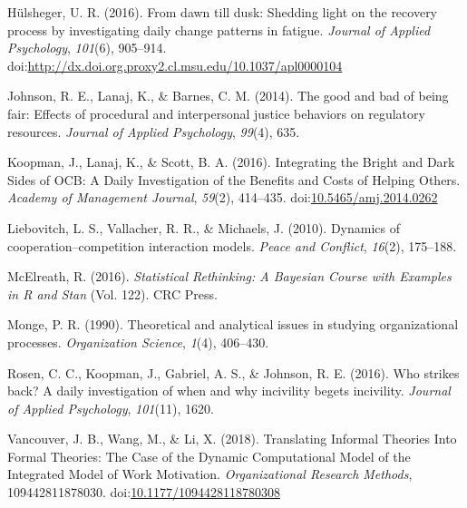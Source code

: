 \documentclass[english,,man]{apa6}
\theoremstyle{definition}
\theoremstyle{definition}
\theoremstyle{definition}
\theoremstyle{remark}
\begin{document}
\leavevmode\hypertarget{ref-hulsheger_dawn_2016}{}%
Hülsheger, U. R. (2016). From dawn till dusk: Shedding light on the
recovery process by investigating daily change patterns in fatigue.
\emph{Journal of Applied Psychology}, \emph{101}(6), 905--914.
doi:\href{https://doi.org/http://dx.doi.org.proxy2.cl.msu.edu/10.1037/apl0000104}{http://dx.doi.org.proxy2.cl.msu.edu/10.1037/apl0000104}

\leavevmode\hypertarget{ref-johnson_good_2014}{}%
Johnson, R. E., Lanaj, K., \& Barnes, C. M. (2014). The good and bad of
being fair: Effects of procedural and interpersonal justice behaviors on
regulatory resources. \emph{Journal of Applied Psychology},
\emph{99}(4), 635.

\leavevmode\hypertarget{ref-koopman_integrating_2016}{}%
Koopman, J., Lanaj, K., \& Scott, B. A. (2016). Integrating the Bright
and Dark Sides of OCB: A Daily Investigation of the Benefits and Costs
of Helping Others. \emph{Academy of Management Journal}, \emph{59}(2),
414--435.
doi:\href{https://doi.org/10.5465/amj.2014.0262}{10.5465/amj.2014.0262}

\leavevmode\hypertarget{ref-liebovitch2010dynamics}{}%
Liebovitch, L. S., Vallacher, R. R., \& Michaels, J. (2010). Dynamics of
cooperation--competition interaction models. \emph{Peace and Conflict},
\emph{16}(2), 175--188.

\leavevmode\hypertarget{ref-mcelreath_statistical_2016}{}%
McElreath, R. (2016). \emph{Statistical Rethinking: A Bayesian Course
with Examples in R and Stan} (Vol. 122). CRC Press.

\leavevmode\hypertarget{ref-monge_theoretical_1990}{}%
Monge, P. R. (1990). Theoretical and analytical issues in studying
organizational processes. \emph{Organization Science}, \emph{1}(4),
406--430.

\leavevmode\hypertarget{ref-rosen_who_2016}{}%
Rosen, C. C., Koopman, J., Gabriel, A. S., \& Johnson, R. E. (2016). Who
strikes back? A daily investigation of when and why incivility begets
incivility. \emph{Journal of Applied Psychology}, \emph{101}(11), 1620.

\leavevmode\hypertarget{ref-vancouver_translating_2018}{}%
Vancouver, J. B., Wang, M., \& Li, X. (2018). Translating Informal
Theories Into Formal Theories: The Case of the Dynamic Computational
Model of the Integrated Model of Work Motivation. \emph{Organizational
Research Methods}, 109442811878030.
doi:\href{https://doi.org/10.1177/1094428118780308}{10.1177/1094428118780308}
\end{document}

